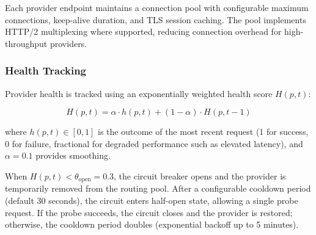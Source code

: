 Each provider endpoint maintains a connection pool with configurable maximum connections, keep-alive duration, and TLS session caching. The pool implements HTTP/2 multiplexing where supported, reducing connection overhead for high-throughput providers.

\subsubsection{Health Tracking}

Provider health is tracked using an exponentially weighted health score $H(p, t)$:

\begin{equation}
H(p, t) = \alpha \cdot h(p, t) + (1 - \alpha) \cdot H(p, t-1)
\end{equation}

where $h(p, t) \in [0, 1]$ is the outcome of the most recent request (1 for success, 0 for failure, fractional for degraded performance such as elevated latency), and $\alpha = 0.1$ provides smoothing.

When $H(p, t) < \theta_{\text{open}} = 0.3$, the circuit breaker opens and the provider is temporarily removed from the routing pool. After a configurable cooldown period (default 30 seconds), the circuit enters half-open state, allowing a single probe request. If the probe succeeds, the circuit closes and the provider is restored; otherwise, the cooldown period doubles (exponential backoff up to 5 minutes).

